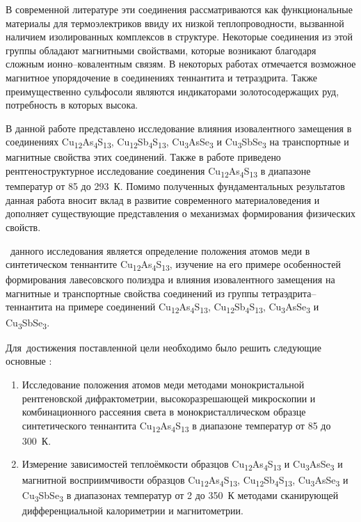 В современной литературе эти соединения рассматриваются как функциональные материалы для термоэлектриков ввиду их низкой теплопроводности, вызванной наличием изолированных комплексов в структуре.
Некоторые соединения из этой группы обладают магнитными свойствами, которые возникают благодаря сложным ионно--ковалентным связям. В некоторых работах отмечается возможное магнитное упорядочение в соединениях теннантита и тетраэдрита.
Также преимущественно сульфосоли являются индикаторами золотосодержащих руд, потребность в которых высока.

В данной работе представлено исследование влияния изовалентного замещения в соединениях Cu\textsubscript{12}As\textsubscript{4}S\textsubscript{13}, Cu\textsubscript{12}Sb\textsubscript{4}S\textsubscript{13}, Cu\textsubscript{3}AsSe\textsubscript{3} и Cu\textsubscript{3}SbSe\textsubscript{3} на транспортные и магнитные свойства этих соединений.
Также в работе приведено рентгеноструктурное исследование соединения  Cu\textsubscript{12}As\textsubscript{4}S\textsubscript{13} в диапазоне температур от 85 до 293~К.  Помимо полученных фундаментальных результатов данная работа вносит вклад в развитие современного материаловедения и дополняет существующие представления о механизмах формирования физических свойств.

 \aim\ данного исследования является определение положения атомов меди в синтетическом теннантите
 Cu\textsubscript{12}As\textsubscript{4}S\textsubscript{13}, изучение на его примере особенностей формирования лавесовского полиэдра и влияния изовалентного замещения на магнитные и транспортные свойства соединений из группы тетраэдрита--теннантита на примере соединений  Cu\textsubscript{12}As\textsubscript{4}S\textsubscript{13}, Cu\textsubscript{12}Sb\textsubscript{4}S\textsubscript{13}, Cu\textsubscript{3}AsSe\textsubscript{3} и Cu\textsubscript{3}SbSe\textsubscript{3}.

Для~достижения поставленной цели необходимо было решить следующие основные {\tasks}:
\begin{enumerate}
  \item Исследование положения атомов меди методами монокристальной	 рентгеновской дифрактометрии, высокоразрешающей микроскопии и комбинационного рассеяния света в монокристаллическом образце синтетического теннантита Cu\textsubscript{12}As\textsubscript{4}S\textsubscript{13} в диапазоне температур от 85 до 300~К.
  \item Измерение зависимостей теплоёмкости образцов Cu\textsubscript{12}As\textsubscript{4}S\textsubscript{13} и Cu\textsubscript{3}AsSe\textsubscript{3} и магнитной восприимчивости  образцов Cu\textsubscript{12}As\textsubscript{4}S\textsubscript{13}, Cu\textsubscript{12}Sb\textsubscript{4}S\textsubscript{13}, Cu\textsubscript{3}AsSe\textsubscript{3} и Cu\textsubscript{3}SbSe\textsubscript{3} в диапазонах температур от 2  до 350~К методами сканирующей дифференциальной калориметрии и магнитометрии.

\end{enumerate}


